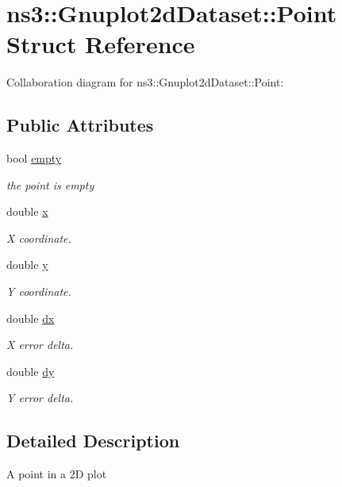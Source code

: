 \hypertarget{structns3_1_1Gnuplot2dDataset_1_1Point}{}\section{ns3\+:\+:Gnuplot2d\+Dataset\+:\+:Point Struct Reference}
\label{structns3_1_1Gnuplot2dDataset_1_1Point}


Collaboration diagram for ns3\+:\+:Gnuplot2d\+Dataset\+:\+:Point\+:
\subsection*{Public Attributes}
\begin{DoxyCompactItemize}
\item 
bool \hyperlink{structns3_1_1Gnuplot2dDataset_1_1Point_ac3e2bfa5adee1760b51a0f51bdc29d52}{empty}
\begin{DoxyCompactList}\small\item\em the point is empty \end{DoxyCompactList}\item 
double \hyperlink{structns3_1_1Gnuplot2dDataset_1_1Point_ac7d609ad6a11724e91d5eb063788c41c}{x}
\begin{DoxyCompactList}\small\item\em X coordinate. \end{DoxyCompactList}\item 
double \hyperlink{structns3_1_1Gnuplot2dDataset_1_1Point_a10456985b5581ce8b2c04a35d41f13f6}{y}
\begin{DoxyCompactList}\small\item\em Y coordinate. \end{DoxyCompactList}\item 
double \hyperlink{structns3_1_1Gnuplot2dDataset_1_1Point_a8cf2b003ae084149550415d438ce1009}{dx}
\begin{DoxyCompactList}\small\item\em X error delta. \end{DoxyCompactList}\item 
double \hyperlink{structns3_1_1Gnuplot2dDataset_1_1Point_ad3279fab8e521eef5ade9af6f55c4137}{dy}
\begin{DoxyCompactList}\small\item\em Y error delta. \end{DoxyCompactList}\end{DoxyCompactItemize}


\subsection{Detailed Description}
A point in a 2D plot 

